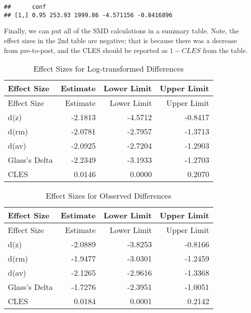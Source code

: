 \documentclass[]{tufte-handout}
\begin{document}
\begin{verbatim}
##      conf                                    
## [1,] 0.95 253.93 1999.86 -4.571156 -0.8416896
\end{verbatim}

Finally, we can put all of the SMD calculations in a summary table.
Note, the effect sizes in the 2nd table are negative; that is because
there was a decrease from pre-to-post, and the CLES should be reported
as \(1-CLES\) from the table.

\begin{longtable}[]{@{}lrrr@{}}
\caption{Effect Sizes for Log-transformed Differences}\tabularnewline
\toprule
Effect Size & Estimate & Lower Limit & Upper Limit\tabularnewline
\midrule
\endfirsthead
\toprule
Effect Size & Estimate & Lower Limit & Upper Limit\tabularnewline
\midrule
\endhead
d(z) & -2.1813 & -4.5712 & -0.8417\tabularnewline
d(rm) & -2.0781 & -2.7957 & -1.3713\tabularnewline
d(av) & -2.0925 & -2.7204 & -1.2903\tabularnewline
Glass's Delta & -2.2349 & -3.1933 & -1.2703\tabularnewline
CLES & 0.0146 & 0.0000 & 0.2070\tabularnewline
\bottomrule
\end{longtable}

\begin{longtable}[]{@{}lrrr@{}}
\caption{Effect Sizes for Observed Differences}\tabularnewline
\toprule
Effect Size & Estimate & Lower Limit & Upper Limit\tabularnewline
\midrule
\endfirsthead
\toprule
Effect Size & Estimate & Lower Limit & Upper Limit\tabularnewline
\midrule
\endhead
d(z) & -2.0889 & -3.8253 & -0.8166\tabularnewline
d(rm) & -1.9477 & -3.0301 & -1.2459\tabularnewline
d(av) & -2.1265 & -2.9616 & -1.3368\tabularnewline
Glass's Delta & -1.7276 & -2.3951 & -1.0051\tabularnewline
CLES & 0.0184 & 0.0001 & 0.2142\tabularnewline
\bottomrule
\end{longtable}

\newpage

\renewcommand\refname{References}

\end{document}
